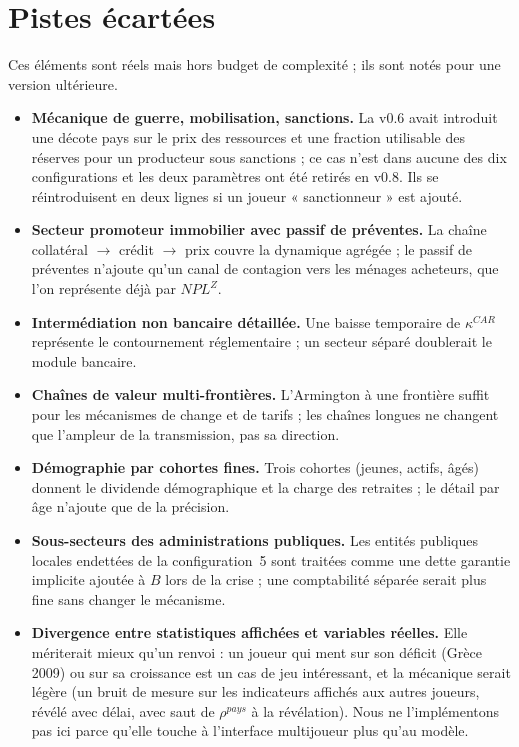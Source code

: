 \documentclass[11pt,a4paper]{article}
\newcommand{\og}{« }
\newcommand{\fg}{ »}
\begin{document}
\section{Pistes écartées}
\label{sec:ecartees}
Ces éléments sont réels mais hors budget de complexité ; ils sont notés pour une version ultérieure.
\begin{itemize}
\item \textbf{Mécanique de guerre, mobilisation, sanctions.} La v0.6 avait introduit une décote pays sur le prix des ressources et une fraction utilisable des réserves pour un producteur sous sanctions ; ce cas n'est dans aucune des dix configurations et les deux paramètres ont été retirés en v0.8. Ils se réintroduisent en deux lignes si un joueur \og sanctionneur\fg{} est ajouté.
\item \textbf{Secteur promoteur immobilier avec passif de préventes.} La chaîne collatéral $\to$ crédit $\to$ prix couvre la dynamique agrégée ; le passif de préventes n'ajoute qu'un canal de contagion vers les ménages acheteurs, que l'on représente déjà par $NPL^Z$.
\item \textbf{Intermédiation non bancaire détaillée.} Une baisse temporaire de $\kappa^{CAR}$ représente le contournement réglementaire ; un secteur séparé doublerait le module bancaire.
\item \textbf{Chaînes de valeur multi-frontières.} L'Armington à une frontière suffit pour les mécanismes de change et de tarifs ; les chaînes longues ne changent que l'ampleur de la transmission, pas sa direction.
\item \textbf{Démographie par cohortes fines.} Trois cohortes (jeunes, actifs, âgés) donnent le dividende démographique et la charge des retraites ; le détail par âge n'ajoute que de la précision.
\item \textbf{Sous-secteurs des administrations publiques.} Les entités publiques locales endettées de la configuration~5 sont traitées comme une dette garantie implicite ajoutée à $B$ lors de la crise ; une comptabilité séparée serait plus fine sans changer le mécanisme.
\item \textbf{Divergence entre statistiques affichées et variables réelles.} Elle mériterait mieux qu'un renvoi : un joueur qui ment sur son déficit (Grèce 2009) ou sur sa croissance est un cas de jeu intéressant, et la mécanique serait légère (un bruit de mesure sur les indicateurs affichés aux autres joueurs, révélé avec délai, avec saut de $\rho^{pays}$ à la révélation). Nous ne l'implémentons pas ici parce qu'elle touche à l'interface multijoueur plus qu'au modèle.

\end{itemize}
\end{document}
